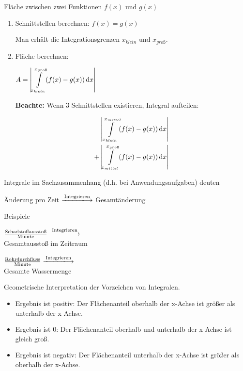 \begin{frage}Fläche zwischen zwei Funktionen $f(x)$ und $g(x)$\end{frage}
\begin{antwort}\large
		\begin{enumerate} 
			\item Schnittstellen berechnen: $f(x)=g(x)$
			
			Man erhält die Integrationsgrenzen $x_{klein}$ und $x_{gro\text{ß}}$.
			\item Fläche berechnen: 
			
				$A=\left|\displaystyle\int\limits_{x_{klein}}^{x_{gro\text{ß}}} \! (f(x)-g(x)) \, \mathrm{d}x\right|$
			
			\textbf{Beachte:} \Large Wenn 3 Schnittstellen existieren, Integral aufteilen:
			
			\normalsize
			\begin{align*}
				&\left|\displaystyle\int\limits_{x_{klein}}^{x_{mittel}} \! (f(x)-g(x)) \, \mathrm{d}x\right|\\
				+&\left|\displaystyle\int\limits_{x_{mittel}}^{x_{gro\text{ß}}} \! (f(x)-g(x)) \, \mathrm{d}x\right|
			\end{align*}
		\end{enumerate}\end{antwort}
\begin{frage}Integrale im Sachzusammenhang (d.h. bei Anwendungsaufgaben) deuten\end{frage}
\begin{antwort}Änderung pro Zeit $\xlongrightarrow{\text{Integrieren}}$ Gesamtänderung 
	
	\bigskip Beispiele
	
	\large\bigskip
	$\frac{\text{Schadstoffausstoß}}{\text{Minute}} \xlongrightarrow{\text{Integrieren}}$ \\ Gesamtausstoß im Zeitraum
	
	\vspace{0.5cm}
	
	$\frac{\text{Rohrdurchfluss}}{\text{Minute}} \xlongrightarrow{\text{Integrieren}}$ \\ Gesamte Wassermenge\end{antwort}
\begin{frage}Geometrische Interpretation der Vorzeichen von Integralen.\end{frage}
\begin{antwort}\begin{itemize} 
		\item Ergebnis ist positiv: Der Flächenanteil oberhalb der x-Achse ist größer als unterhalb der x-Achse.
		\item Ergebnis ist 0: Der Flächenanteil oberhalb und unterhalb der x-Achse ist gleich groß.
		\item Ergebnis ist negativ: Der Flächenanteil unterhalb der x-Achse ist größer als oberhalb der x-Achse.
	\end{itemize}\end{antwort}
